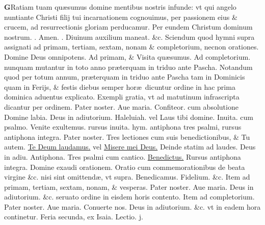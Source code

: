 \documentclass[a5paper,10pt]{book}
\def\ae{æ}
\begin{document}
\begin{multicols*}{2}
\lettrine[lines=2]{\bfseries \color{red} G}{}Ratiam tuam qu\ae sumus domine mentibus nostris infunde: vt qui angelo nuntiante Christi filij tui incarnationem cognouimus, per passionem eius \& crucem, ad resurrectionis gloriam perducamur. Per eundem Christum dominum nostrum. \color{red} \Rbar . \color{black} Amen. \color{red} \Vbar . \color{black} Diuinum auxilium maneat. \&c.
\newline {} \color{red} Sciendum quod hymni supra assignati ad primam, tertiam, sextam, nonam \& completorium, necnon orationes. \color{black} Domine Deus omnipotens. \color{red} Ad primam, \& \color{black} Visita qu\ae sumus. \color{red} Ad completorium. nunquam mutantur in toto anno pr\ae terquam in triduo ante Pascha. \color{black}
\newline {} \color{red} Notandum quod per totum annum, pr\ae terquam in triduo ante Pascha tam in Dominicis quam in Ferijs, \& festis diebus semper hor\ae \ dicuntur ordine in hac prima dominica aduentus explicato. Exempli gratia, vt ad matutinum infrascripta dicantur per ordinem. \color{black} Pater noster. Aue maria. Confiteor. \color{red} cum absolutione \color{black} Domine labia. Deus in adiutorium. Haleluiah. \color{red} vel \color{black} Laus tibi domine. \color{red} Inuita. cum psalmo. \color{black} Venite exultemus. \color{red} rursus inuita. hym. antiphona tres psalmi, rursus antiphona integra. \color{black} Pater noster. \color{red} Tres lectiones cum suis benedictionibus, \& \color{black} Tu autem. \hyperlink{tedeum}{Te Deum laudamus.} \color{red} vel \color{black} \hyperlink{ps50}{Misere mei Deus.} \color{red} Deinde statim ad laudes. \color{black} Deus in adiu. \color{red} Antiphona. Tres psalmi cum cantico. \color{black} \hyperlink{Benedictus}{Benedictus.} \color{red} Rursus antiphona integra. \color{black} Domine exaudi orationem. \color{red} Oratio cum commemorationibus de beata virgine \&c. nisi sint omittend\ae , vt supra. \color{black} Benedicamus. Fidelium. \&c. \color{red} Item ad primam, tertiam, sextam, nonam, \& vesperas. \color{black} Pater noster. Aue maria. Deus in adiutorium. \&c. \color{red} seruato ordine in eisdem horis contento. \color{black}
\newline {} \color{red} Item ad completorium. \color{black} Pater noster. Aue maria. Conuerte nos. Deus in adiutorium. \color{red} \&c. vt in eadem hora continetur. \color{black}
\newline \color{red} \hypertarget{MON-PRIMA-ADV}{Feria secunda,} ex Isaia. \hfill Lectio. j. \color{black}

\end{multicols*}
\end{document}
